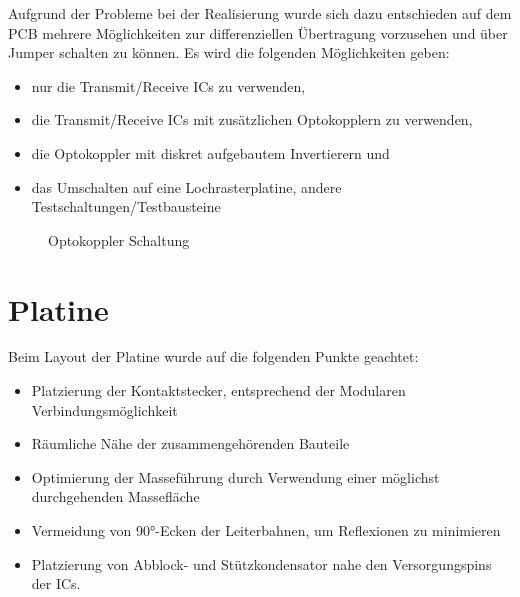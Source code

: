 Aufgrund der Probleme bei der Realisierung wurde sich dazu entschieden auf dem PCB mehrere Möglichkeiten zur differenziellen Übertragung vorzusehen 
und über Jumper schalten zu können. 
Es wird die folgenden Möglichkeiten geben:

\begin{itemize}
\item nur die Transmit/Receive ICs zu verwenden,
\item die Transmit/Receive ICs mit zusätzlichen Optokopplern zu verwenden,
\item die Optokoppler mit diskret aufgebautem Invertierern und
\item das Umschalten auf eine Lochrasterplatine, andere Testschaltungen/Testbausteine
\end{itemize}



\begin{figure}[H]
    \centering    
    \caption{Optokoppler Schaltung}
    \label{Optokoppler}
\end{figure}



\newpage
\section{Platine}
Beim Layout der Platine wurde auf die folgenden Punkte geachtet:

\begin{itemize}
	\item Platzierung der Kontaktstecker, entsprechend der Modularen Verbindungsmöglichkeit
	\item Räumliche Nähe der zusammengehörenden Bauteile
	\item Optimierung der Masseführung durch Verwendung einer möglichst durchgehenden Massefläche
	\item Vermeidung von 90°-Ecken der Leiterbahnen, um Reflexionen zu minimieren
	\item Platzierung von Abblock- und Stützkondensator nahe den Versorgungspins der ICs.
\end{itemize}




